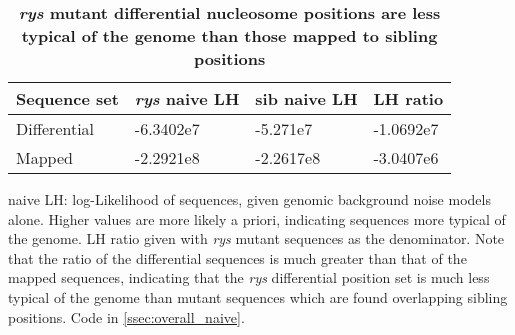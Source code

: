 \begin{table}
    \caption{{\bf \textit{rys} mutant differential nucleosome positions are less typical of the genome than those mapped to sibling positions}}

    \begin{tabular}{|l|l|l|l|}
        \hline
        {\bf Sequence set} & {\bf \textit{rys} naive LH} & {\bf sib naive LH} & {\bf LH ratio}\\ \hline
        Differential & -6.3402e7 & -5.271e7 & -1.0692e7\\ \hline
        Mapped & -2.2921e8 & -2.2617e8 & -3.0407e6\\ \hline
        \end{tabular}

        \begin{flushleft}naive LH: log-Likelihood of sequences, given genomic background noise models alone. Higher values are more likely a priori, indicating sequences more typical of the genome. LH ratio given with \textit{rys} mutant sequences as the denominator. Note that the ratio of the differential sequences is much greater than that of the mapped sequences, indicating that the \textit{rys} differential position set is much less typical of the genome than mutant sequences which are found overlapping sibling positions. Code in \autoref{ssec:overall_naive}.
        \end{flushleft}
        \label{naivelhtable}
\end{table}